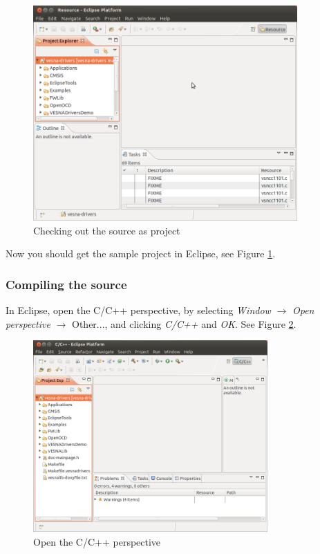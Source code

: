 \documentclass[a4paper, 10pt]{article}
\begin{document}
    \begin{figure}[H]
    \centering
        \includegraphics[width=0.9\textwidth]{./install-guide-linux-images/test-got-project.png}
        \caption{Checking out the source as project}
        \label{fig:test-got-project}
    \end{figure}

Now you should get the sample project in Eclipse, see
Figure \ref{fig:test-got-project}.

\subsubsection{Compiling the source}

In Eclipse, open the C/C++ perspective,  by selecting \emph{Window} $\rightarrow$
\emph{Open perspective} $\rightarrow$ Other...,
and clicking \emph{C/C++} and \emph{OK}.
See Figure \ref{fig:compile-c-perspective}.

    \begin{figure}[H]
    \centering
        \includegraphics[width=0.8\textwidth]{./install-guide-linux-images/compile-c-perspective.png}
        \caption{Open the C/C++ perspective}
        \label{fig:compile-c-perspective}
    \end{figure}
\end{document}
